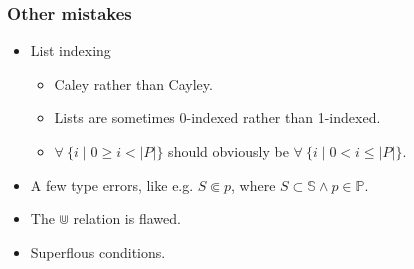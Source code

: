 \begin{frame}

\frametitle{Other mistakes}

\begin{itemize}

\item List indexing

\begin{itemize}

\item Caley rather than Cayley.

\item \bi Lists are sometimes 0-indexed rather than 1-indexed.

\item \bi $\forall\ \{i\mid 0\geq i < |P|\}$ should obviously be $\forall\
\{i\mid 0< i \leq |P|\}$.

\end{itemize}

\item A few type errors, like e.g. $S\Subset p$, where $S\subset\mathbb{S}
\wedge p\in\mathbb{P}$.

\item The $\Cup$ relation is flawed.

\item Superflous conditions.

\end{itemize}

\end{frame}
